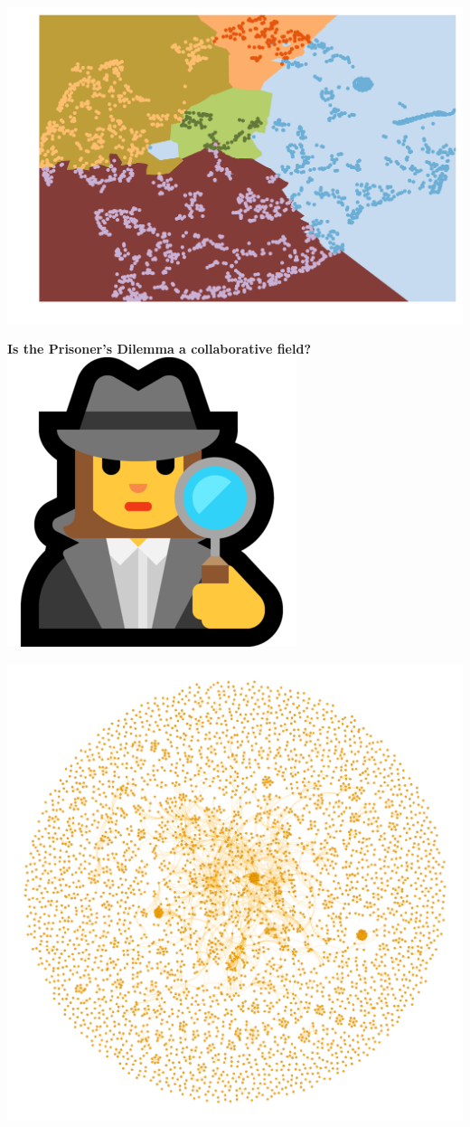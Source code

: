\documentclass{beamer}
\begin{document}
\begin{frame}
    \begin{center}
    \includegraphics[width=.8\textwidth]{static/topics_5.png}
    \end{center}
\end{frame}

\begin{frame}
    \begin{center}
        
    \end{center}
\end{frame}

\begin{frame}
    \begin{center}
        \LARGE{\textbf{Is the Prisoner's Dilemma a collaborative field?}} \\ \vspace{.6cm}
        \includegraphics[width=.15\textwidth]{static/detective.png} \\ \vspace{.5cm}
    \end{center}
\end{frame}

\begin{frame}
    \begin{center}
    \includegraphics[width=.7\textwidth]{static/pd.png}
    \end{center}
\end{frame}
\end{document}
